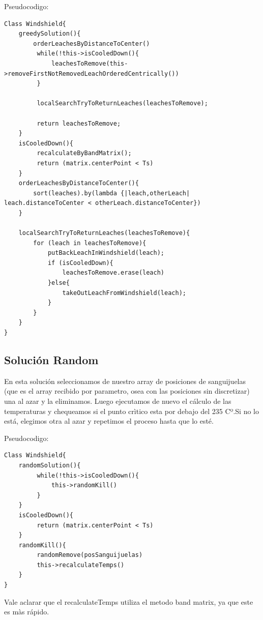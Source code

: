 Pseudocodigo:

\begin{verbatim}
Class Windshield{
    greedySolution(){
        orderLeachesByDistanceToCenter()
         while(!this->isCooledDown(){
             leachesToRemove(this->removeFirstNotRemovedLeachOrderedCentrically())
         }

         localSearchTryToReturnLeaches(leachesToRemove);

         return leachesToRemove;
    } 
    isCooledDown(){
         recalculateByBandMatrix();
         return (matrix.centerPoint < Ts)
    }
    orderLeachesByDistanceToCenter(){
        sort(leaches).by(lambda {|leach,otherLeach| leach.distanceToCenter < otherLeach.distanceToCenter})
    }

    localSearchTryToReturnLeaches(leachesToRemove){
        for (leach in leachesToRemove){
            putBackLeachInWindshield(leach);
            if (isCooledDown){
                leachesToRemove.erase(leach)
            }else{
                takeOutLeachFromWindshield(leach);
            }
        }
    }
}
\end{verbatim}



\subsection{Solución Random}\label{sec:solucionRandom}


En esta solución seleccionamos de nuestro array de posiciones de sanguijuelas (que es el array recibido por parametro, osea con las posiciones sin discretizar) una al azar y la eliminamos. Luego ejecutamos de nuevo el cálculo de las temperaturas y chequeamos si el punto crìtico esta por debajo del 235 Cº.Si no lo está, elegimos otra al azar y repetimos el proceso hasta que lo esté. 

Pseudocodigo:

\begin{verbatim}
Class Windshield{
    randomSolution(){
         while(!this->isCooledDown(){
             this->randomKill()
         }
    } 
    isCooledDown(){
         return (matrix.centerPoint < Ts)
    }
    randomKill(){
         randomRemove(posSanguijuelas)
         this->recalculateTemps()
    }
}
\end{verbatim}

Vale aclarar que el recalculateTemps utiliza el metodo band matrix, ya que este es màs rápido.









